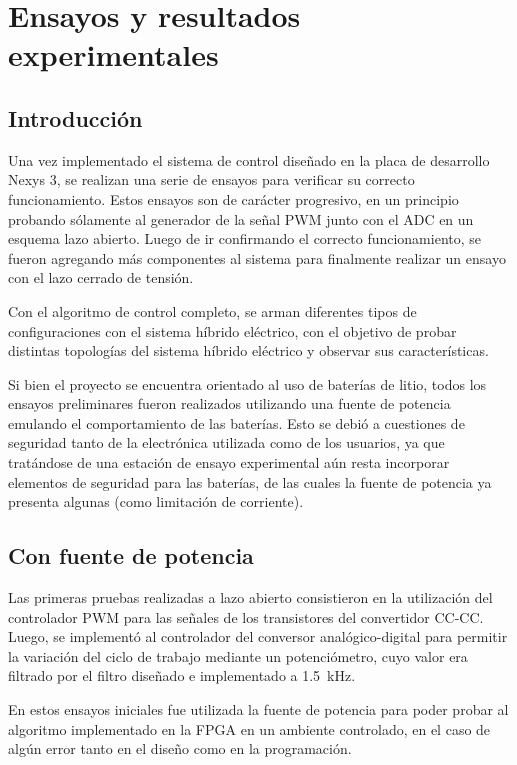 \chapter{Ensayos y resultados experimentales}

\section{Introducción}

Una vez implementado el sistema de control diseñado en la placa de desarrollo Nexys 3, se realizan una serie de ensayos para verificar su correcto funcionamiento. Estos ensayos son de carácter progresivo, en un principio probando sólamente al generador de la señal PWM junto con el ADC en un esquema lazo abierto. Luego de ir confirmando el correcto funcionamiento, se fueron agregando más componentes al sistema para finalmente realizar un ensayo con el lazo cerrado de tensión.

Con el algoritmo de control completo, se arman diferentes tipos de configuraciones con el sistema híbrido eléctrico, con el objetivo de probar distintas topologías del sistema híbrido eléctrico y observar sus características.

Si bien el proyecto se encuentra orientado al uso de baterías de litio, todos los ensayos preliminares fueron realizados utilizando una fuente de potencia emulando el comportamiento de las baterías. Esto se debió a cuestiones de seguridad tanto de la electrónica utilizada como de los usuarios, ya que tratándose de una estación de ensayo experimental aún resta incorporar elementos de seguridad para las baterías, de las cuales la fuente de potencia ya presenta algunas (como limitación de corriente). 



\section{Con fuente de potencia}

Las primeras pruebas realizadas a lazo abierto consistieron en la utilización del controlador PWM para las señales de los transistores del convertidor CC-CC. Luego, se implementó al controlador del conversor analógico-digital para permitir la variación del ciclo de trabajo mediante un potenciómetro, cuyo valor era filtrado por el filtro diseñado e implementado a \SI{1.5}{\kilo\hertz}.

En estos ensayos iniciales fue utilizada la fuente de potencia para poder probar al algoritmo implementado en la FPGA en un ambiente controlado, en el caso de algún error tanto en el diseño como en la programación.

